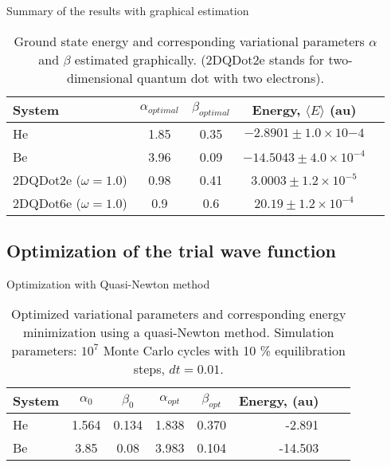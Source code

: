 \begin{frame}{Summary of the results with graphical estimation}
  \begin{scriptsize}
  \begin{table}[!hbt]
  \centering
    \begin{tabular}{lcccr}
      \toprule[1pt]
      \textbf{System} & $\alpha_{optimal}$ & $\beta_{optimal}$ & \textbf{Energy}, $\langle E \rangle$ (au) \\
      \midrule[1pt]
      He      &  1.85   &   0.35  & $-2.8901 \pm 1.0 \times 10{-4}$ \\
      Be      &  3.96   &   0.09  & $-14.5043 \pm 4.0 \times 10^{-4}$\\
      2DQDot2e ($\omega=1.0$) & 0.98  & 0.41  & $3.0003 \pm 1.2 \times 10^{-5}$ \\
      2DQDot6e ($\omega = 1.0$) & 0.9   & 0.6 & $20.19 \pm 1.2 \times 10^{-4}$\\
      \bottomrule[1pt]
    \end{tabular}\caption{Ground state energy and corresponding variational parameters  $\alpha$ and $\beta$ estimated graphically. (2DQDot2e stands for two-dimensional quantum dot with two electrons).}
    \label{energiesWithGraphPar}
  \end{table}
  \end{scriptsize}
\end{frame}

\subsection{Optimization of the trial wave function}
\begin{frame}{Optimization with Quasi-Newton method}

  \begin{scriptsize}
  \begin{table}[!hbt]
  \centering
  \begin{tabular}{lccccrcc}
    \toprule[1pt]
    \textbf{System} & $\alpha_{0}$ & $\beta_{0}$ & $\alpha_{opt}$ & $\beta_{opt}$ &\textbf{Energy}, (au)\\
    \midrule[1pt]
    He              & 1.564  & 0.134    & 1.838   &  0.370  & -2.891   \\
    Be              & 3.85  & 0.08    & 3.983   &  0.104  &   -14.503  \\
    \bottomrule[1pt]
  \end{tabular}\caption{Optimized variational parameters and corresponding energy minimization using a quasi-Newton method. Simulation parameters: $10^7$ Monte Carlo cycles with 10 \% equilibration steps, $dt = 0.01$.}\label{optizedQuasiNewtonParameters}
  \end{table}
  \end{scriptsize}

\end{frame}




